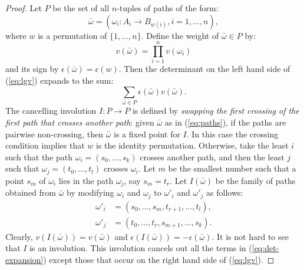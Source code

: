 \documentclass[11pt]{amsproc}
\theoremstyle{definition}
\theoremstyle{example}
\begin{document}
\begin{proof}
  Let $P$ be the set of all $n$-tuples of paths of the form:
  \begin{equation}
    \label{eq:paths}
    \bar\omega = (\omega_i:A_i\to B_{w(i)}, i=1,\dotsc, n),
  \end{equation}
  where $w$ is a permutation of $\{1,\dotsc, n\}$.
  Define the weight of $\bar \omega\in P$ by:
  \begin{displaymath}
    v(\bar\omega) = \prod_{i=1}^n v(\omega_i)
  \end{displaymath}
  and its sign by $\epsilon(\bar\omega)=\epsilon(w)$.
  Then the determinant on the left hand side of (\ref{eq:lgv}) expands to the sum:
  \begin{equation}
    \label{eq:det-expansion}
    \sum_{\bar\omega\in P} \epsilon(\bar\omega)v(\bar\omega).
  \end{equation}
  The cancelling involution $I:P\to P$ is defined by \emph{swapping the first crossing of the first path that crosses another path}: given $\bar\omega$ as in (\ref{eq:paths}), if the paths are pairwise non-crossing, then $\bar\omega$ is a fixed point for $I$.
  In this case the crossing condition implies that $w$ is the identity permutation.
  Otherwise, take the least $i$ such that the path $\omega_i=(s_0,\dotsc,s_k)$ crosses another path, and then the least $j$ such that $\omega_j=(t_0,\dotsc,t_l)$ crosses $\omega_i$.
  Let $m$ be the smallest number such that a point $s_m$ of $\omega_i$ lies in the path $\omega_j$, say $s_m=t_r$.
  Let $I(\bar\omega)$ be the family of paths obtained from $\bar\omega$ by modifying $\omega_i$ and $\omega_j$ to $\omega'_i$ and $\omega'_j$ as follows:
  \begin{align*}
    \omega'_i & = (s_0,\dotsc, s_m, t_{r+1}, \dotsc, t_l),\\
    \omega'_j & = (t_0,\dotsc, t_r, s_{m+1}, \dotsc, s_k).
  \end{align*}
  Clearly, $v(I(\bar\omega)) = v(\bar\omega)$ and $\epsilon(I(\bar\omega)) = - \epsilon(\bar\omega)$.
  It is not hard to see that $I$ is an involution.
  This involution cancels out all the terms in (\ref{eq:det-expansion}) except those that occur on the right hand side of (\ref{eq:lgv}).
\end{proof}
\end{document}
